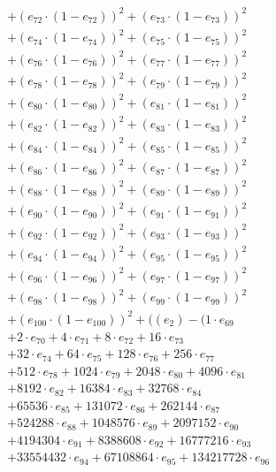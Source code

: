 \documentclass[10pt, a4paper]{article}
\begin{document}
\begin{small}
\begin{align*}
& + (e_{72} \cdot (1 - e_{72}))^{2} + (e_{73} \cdot (1 - e_{73}))^{2} \\
& + (e_{74} \cdot (1 - e_{74}))^{2} + (e_{75} \cdot (1 - e_{75}))^{2} \\
& + (e_{76} \cdot (1 - e_{76}))^{2} + (e_{77} \cdot (1 - e_{77}))^{2} \\
& + (e_{78} \cdot (1 - e_{78}))^{2} + (e_{79} \cdot (1 - e_{79}))^{2} \\
& + (e_{80} \cdot (1 - e_{80}))^{2} + (e_{81} \cdot (1 - e_{81}))^{2} \\
& + (e_{82} \cdot (1 - e_{82}))^{2} + (e_{83} \cdot (1 - e_{83}))^{2} \\
& + (e_{84} \cdot (1 - e_{84}))^{2} + (e_{85} \cdot (1 - e_{85}))^{2} \\
& + (e_{86} \cdot (1 - e_{86}))^{2} + (e_{87} \cdot (1 - e_{87}))^{2} \\
& + (e_{88} \cdot (1 - e_{88}))^{2} + (e_{89} \cdot (1 - e_{89}))^{2} \\
& + (e_{90} \cdot (1 - e_{90}))^{2} + (e_{91} \cdot (1 - e_{91}))^{2} \\
& + (e_{92} \cdot (1 - e_{92}))^{2} + (e_{93} \cdot (1 - e_{93}))^{2} \\
& + (e_{94} \cdot (1 - e_{94}))^{2} + (e_{95} \cdot (1 - e_{95}))^{2} \\
& + (e_{96} \cdot (1 - e_{96}))^{2} + (e_{97} \cdot (1 - e_{97}))^{2} \\
& + (e_{98} \cdot (1 - e_{98}))^{2} + (e_{99} \cdot (1 - e_{99}))^{2} \\
& + (e_{100} \cdot (1 - e_{100}))^{2} + ((e_{2}) - (1 \cdot e_{69} \\
& + 2 \cdot e_{70} + 4 \cdot e_{71} + 8 \cdot e_{72} + 16 \cdot e_{73} \\
& + 32 \cdot e_{74} + 64 \cdot e_{75} + 128 \cdot e_{76} + 256 \cdot e_{77} \\
& + 512 \cdot e_{78} + 1024 \cdot e_{79} + 2048 \cdot e_{80} + 4096 \cdot e_{81} \\
& + 8192 \cdot e_{82} + 16384 \cdot e_{83} + 32768 \cdot e_{84} \\
& + 65536 \cdot e_{85} + 131072 \cdot e_{86} + 262144 \cdot e_{87} \\
& + 524288 \cdot e_{88} + 1048576 \cdot e_{89} + 2097152 \cdot e_{90} \\
& + 4194304 \cdot e_{91} + 8388608 \cdot e_{92} + 16777216 \cdot e_{93} \\
& + 33554432 \cdot e_{94} + 67108864 \cdot e_{95} + 134217728 \cdot e_{96} \\

\end{align*}
\end{small}
\end{document}
